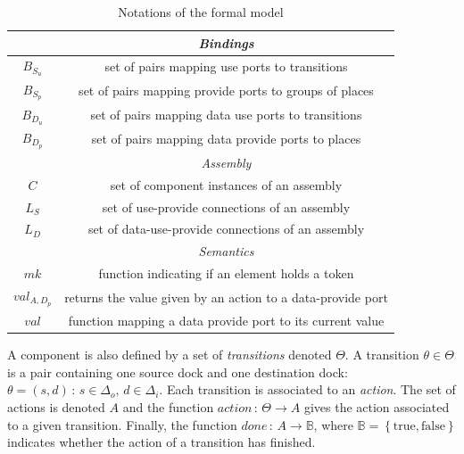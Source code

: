 {\begin{table}[tp]
{\begin{tabular}{|c|c|}
      \hline
      \hline
      & \emph{Bindings}\\
      \hline
      $B_{S_{u}}$ & set of pairs mapping use ports to transitions\\
      $B_{S_{p}}$ & set of pairs mapping provide ports to groups of places\\
      $B_{D_{u}}$ & set of pairs mapping data use ports to transitions\\
      $B_{D_{p}}$ & set of pairs mapping data provide ports to places\\
      \hline
      \hline
      & \emph{Assembly}\\
      \hline
      $C$ & set of component instances of an assembly\\
      $L_S$ & set of use-provide connections of an assembly\\
      $L_D$ & set of data-use-provide connections of an assembly\\
      \hline
      \hline
      & \emph{Semantics}\\
      \hline
      $mk$ & function indicating if an element holds a token\\
      $val_{A,D_p}$ & returns the value given by an action to a data-provide port\\
      $val$ & function mapping a data provide port to its current value\\
      \hline
    \end{tabular}
  }
  \caption{Notations of the \mad formal model}
  \label{tab:not}
\end{table}
A component is also defined by a set of \emph{transitions} denoted
$\Theta$. A transition $\theta \in \Theta$ is a pair containing one
source dock and one destination dock: $\theta =
\left(s,d\right)\,:\,s\in\Delta_{o},\,d\in\Delta_{i}$. 
%
Each transition is associated to an \emph{action}. The set of actions is
denoted $A$ and the function $action\,:\,\Theta\rightarrow A$ gives the action
associated to a given transition. Finally, the function
$done\,:\,A\rightarrow\mathbb{B}$, where $\mathbb{B}=\left\{
\text{true},\text{false}\right\}$ indicates whether the action of a
transition has finished.
  
}

